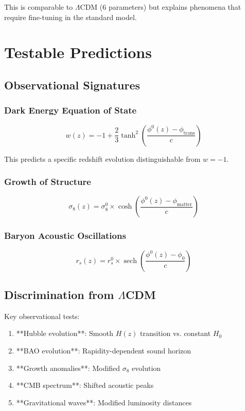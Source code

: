 \documentclass[12pt,a4paper]{article}
\begin{document}
This is comparable to $\Lambda$CDM (6 parameters) but explains phenomena that require fine-tuning in the standard model.

\section{Testable Predictions}

\subsection{Observational Signatures}

\subsubsection{Dark Energy Equation of State}
\begin{equation}
w(z) = -1 + \frac{2}{3}\tanh^2\left(\frac{\phi^0(z) - \phi_{\text{trans}}}{c}\right)
\end{equation}

This predicts a specific redshift evolution distinguishable from $w = -1$.

\subsubsection{Growth of Structure}
\begin{equation}
\sigma_8(z) = \sigma_8^0 \times \cosh\left(\frac{\phi^0(z) - \phi_{\text{matter}}}{c}\right)
\end{equation}

\subsubsection{Baryon Acoustic Oscillations}
\begin{equation}
r_s(z) = r_s^0 \times \operatorname{sech}\left(\frac{\phi^0(z) - \phi_0}{c}\right)
\end{equation}

\subsection{Discrimination from $\Lambda$CDM}

Key observational tests:
\begin{enumerate}
\item **Hubble evolution**: Smooth $H(z)$ transition vs. constant $H_0$
\item **BAO evolution**: Rapidity-dependent sound horizon
\item **Growth anomalies**: Modified $\sigma_8$ evolution
\item **CMB spectrum**: Shifted acoustic peaks
\item **Gravitational waves**: Modified luminosity distances
\end{enumerate}
\end{document}
